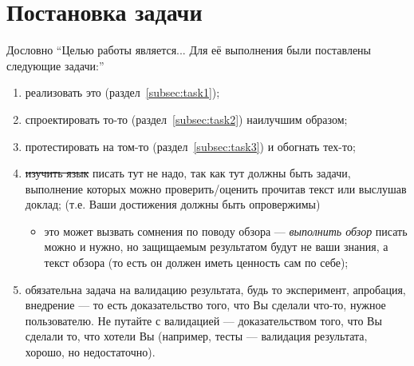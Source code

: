
\section{Постановка задачи}
\label{sec:task}
Дословно \enquote{Целью работы является... Для её выполнения были постав\-лены следующие задачи:}
\begin{enumerate}
    \item реализовать это (раздел~\ref{subsec:task1});
    \item спроектировать то-то (раздел~\ref{subsec:task2}) наилучшим образом;
    \item протестировать на том-то (раздел~\ref{subsec:task3}) и обогнать тех-то;
    \item \sout{изучить язык \OCaml{}} писать тут не надо, так как тут должны быть задачи, выполнение которых можно проверить/оценить прочитав текст или выслушав доклад;
          (т.е. Ваши достижения должны быть опровержимы)
          \begin{itemize}
              \item это может вызвать сомнения по поводу обзора --- \emph{выполнить обзор} писать можно и нужно, но защищаемым результатом будут не ваши знания, а текст обзора (то есть он должен иметь ценность сам по себе);
          \end{itemize}
    \item обязательна задача на валидацию результата, будь то эксперимент, апробация, внедрение --- то есть доказательство того, что Вы сделали что-то, нужное пользователю. Не путайте с валидацией --- доказательством того, что Вы сделали то, что хотели Вы (например, тесты --- валидация результата, хорошо, но недостаточно).
\end{enumerate}
